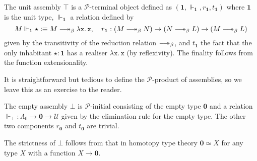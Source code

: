\documentclass[a4paper,UKenglish,numberwithinsect,cleveref,thm-restate]{lipics-v2021}
\newcommand{\eqv}[2]{\ensuremath{#1 \simeq #2}\xspace}
\newcommand{\PP}{\mathscr{P}}
\newcommand{\defeq}{\vcentcolon\equiv}
\newcommand{\Univ}{\mathcal{U}}
\newcommand{\Unit}{\mathbf{1}}
\newcommand{\Empty}{\mathbf{0}}
\DeclareRobustCommand\longtwoheadrightarrow{\relbar\joinrel\twoheadrightarrow}
\newcommand{\reduce}{\longtwoheadrightarrow_{\beta}}
\theoremstyle{plain}
\begin{document}
\begin{example}
  The unit assembly $\top$ is a $\PP$-terminal object defined as $(\Unit, \Vdash_{\Unit}, r_{\Unit}, t_{\Unit})$ where $\Unit$ is the unit type,  
  $\Vdash_{\Unit}$ a relation defined by
  \[
    M \Vdash_{\Unit} \star \defeq M \reduce \mathtt{\lambda x.\, x}, 
    \quad r_{\Unit}: (M \reduce N) \to (N \reduce L) \to (M \reduce L)
  \]
  given by the transitivity of the reduction relation $\reduce$, and $t_{\Unit}$ the fact that the only inhabitant $\star : \Unit$ has a realiser $\mathtt{\lambda x.\, x}$ (by reflexivity).
  The finality follows from the function extensionality.
\end{example}

It is straightforward but tedious to define the $\PP$-product of assemblies, so we leave this as an exercise to the reader. 
\begin{example}
The empty assembly $\bot$ is $\PP$-initial consisting of the empty type $\Empty$ and a relation $\Vdash_\bot : \Lambda_0 \to \Empty \to \Univ$ given by the elimination rule for the empty type.
The other two components $r_\Empty$ and $t_\Empty$ are trivial.

The strictness of $\bot$ follows from that in homotopy type theory $\eqv{\Empty}{X}$ for any type $X$ with a function $X \to \Empty$.
\end{example}
\end{document}
